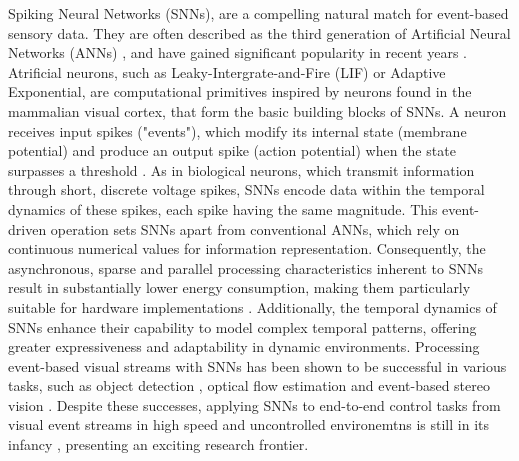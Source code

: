 \documentclass{article}
\begin{document}
Spiking Neural Networks (SNNs), are a compelling natural match for event-based sensory data. They are often described as the third generation of Artificial Neural Networks (ANNs) \cite{maassNetworksSpikingNeurons1997a}, and have gained significant popularity in recent years \cite{gallegoEventbasedVisionSurvey2022}. Atrificial neurons, such as Leaky-Intergrate-and-Fire (LIF) or Adaptive Exponential, are computational primitives inspired by neurons found in the mammalian visual cortex, that form the basic building blocks of SNNs. A neuron receives input spikes ("events"), which modify its internal state (membrane potential) and produce an output spike (action potential) when the state surpasses a threshold \cite{gallegoEventbasedVisionSurvey2022}. As in biological neurons, which transmit information through short, discrete voltage spikes, SNNs encode data within the temporal dynamics of these spikes, each spike having the same magnitude. This event-driven operation sets SNNs apart from conventional ANNs, which rely on continuous numerical values for information representation. Consequently, the asynchronous, sparse and parallel processing characteristics inherent to SNNs result in substantially lower energy consumption, making them particularly suitable for hardware implementations \cite{farsaLowCostHighSpeedNeuromorphic2019, siddiqueLowCostNeuromorphic2023}. Additionally, the temporal dynamics of SNNs enhance their capability to model complex temporal patterns, offering greater expressiveness and adaptability in dynamic environments. Processing event-based visual streams with SNNs has been shown to be successful in various tasks, such as object detection \cite{iaboniEventbasedSpikingNeural2024}, optical flow estimation \cite{cuadradoOpticalFlowEstimation2023} and event-based stereo vision \cite{osswaldSpikingNeuralNetwork2017}. Despite these successes, applying SNNs to end-to-end control tasks from visual event streams in high speed and uncontrolled environemtns is still in its infancy \cite{stroobantsNeuromorphicAttitudeEstimation2025, paredes-vallesFullyNeuromorphicVision2023b, onizTrajectoryControlQuadrotors2024}, presenting an exciting research frontier. 
\end{document}
